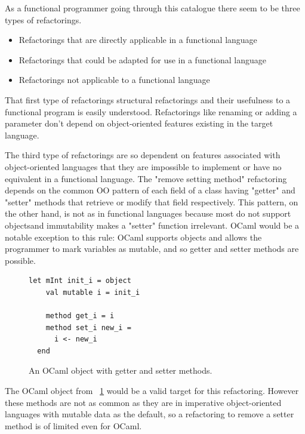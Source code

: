 As a functional programmer \DIFdelbegin {}\DIFdelend going through this catalogue \DIFdelbegin {}\DIFdelend there seem to be three types of refactorings.

\begin{itemize}
	\item Refactorings that are directly applicable in a functional language
	\item Refactorings that could be adapted for use in a functional language
	\item Refactorings not applicable to a functional language
\end{itemize}

That first type of refactorings \DIFdelbegin {}\DIFdelend \DIFaddbegin {}\DIFaddend structural refactorings and their usefulness to a functional program is easily understood. Refactorings like renaming or adding a parameter don't depend on object-oriented features existing in the target language.

The third type of refactorings are so dependent on features associated with object-oriented languages that they are impossible to implement or have no equivalent in a functional language. The "remove setting method" refactoring depends on the common OO pattern of each field of a class having "getter" and "setter" methods that retrieve or modify that field respectively. This pattern, on the other hand, is not as \DIFdelbegin {}\DIFdelend \DIFaddbegin {}\DIFaddend in functional languages because most do not support objects\DIFaddbegin \DIFadd{, }\DIFaddend and immutability makes a "setter" function irrelevant. OCaml would be a notable exception to this rule: OCaml supports objects and allows the programmer to mark variables as mutable, and so getter and setter methods are possible.

\begin{figure}[t]
\begin{lstlisting}[language=caml, morekeywords={object,method}]
let mInt init_i = object
    val mutable i = init_i

    method get_i = i
    method set_i new_i =
      i <- new_i
  end
\end{lstlisting}
\caption{An OCaml object with getter and setter methods.}
\label{ocamlObj}
\end{figure}

The OCaml object from \DIFdelbegin {}\DIFdelend \DIFaddbegin {}\DIFaddend ~\ref{ocamlObj} would be a valid target for this refactoring. However these methods are not as common as they are in imperative object-oriented languages with mutable data as the default, so a refactoring to remove a setter method is of limited \DIFdelbegin {}\DIFdelend \DIFaddbegin {}\DIFaddend even for OCaml.

